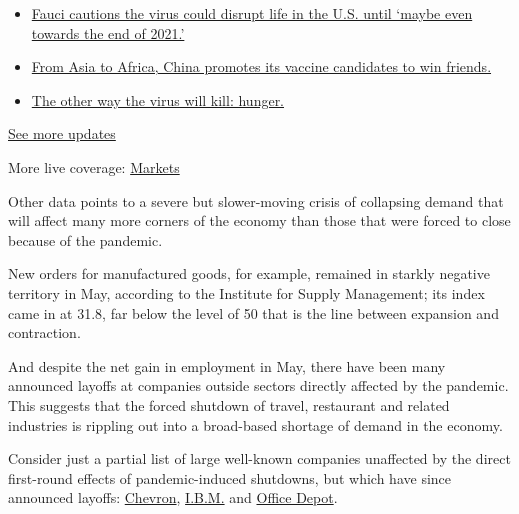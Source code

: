 \begin{itemize}
\tightlist
\item
  \href{https://www.nytimes3xbfgragh.onion/2020/09/11/world/covid-19-coronavirus.html?action=click\&pgtype=Article\&state=default\&region=MAIN_CONTENT_1\&context=storylines_live_updates\#link-dfb8a16}{Fauci
  cautions the virus could disrupt life in the U.S. until `maybe even
  towards the end of 2021.'}
\item
  \href{https://www.nytimes3xbfgragh.onion/2020/09/11/world/covid-19-coronavirus.html?action=click\&pgtype=Article\&state=default\&region=MAIN_CONTENT_1\&context=storylines_live_updates\#link-7104d154}{From
  Asia to Africa, China promotes its vaccine candidates to win friends.}
\item
  \href{https://www.nytimes3xbfgragh.onion/2020/09/11/world/covid-19-coronavirus.html?action=click\&pgtype=Article\&state=default\&region=MAIN_CONTENT_1\&context=storylines_live_updates\#link-393ad215}{The
  other way the virus will kill: hunger.}
\end{itemize}

\href{https://www.nytimes3xbfgragh.onion/2020/09/11/world/covid-19-coronavirus.html?action=click\&pgtype=Article\&state=default\&region=MAIN_CONTENT_1\&context=storylines_live_updates}{See
more updates}

More live coverage:
\href{https://www.nytimes3xbfgragh.onion/live/2020/09/11/business/stock-market-today-coronavirus?action=click\&pgtype=Article\&state=default\&region=MAIN_CONTENT_1\&context=storylines_live_updates}{Markets}

Other data points to a severe but slower-moving crisis of collapsing
demand that will affect many more corners of the economy than those that
were forced to close because of the pandemic.

New orders for manufactured goods, for example, remained in starkly
negative territory in May, according to the Institute for Supply
Management; its index came in at 31.8, far below the level of 50 that is
the line between expansion and contraction.

And despite the net gain in employment in May, there have been many
announced layoffs at companies outside sectors directly affected by the
pandemic. This suggests that the forced shutdown of travel, restaurant
and related industries is rippling out into a broad-based shortage of
demand in the economy.

Consider just a partial list of large well-known companies unaffected by
the direct first-round effects of pandemic-induced shutdowns, but which
have since announced layoffs:
\href{https://www.reuters.com/article/us-chevron-layoffs-exclusive/exclusive-chevron-to-cut-up-to-15-of-staff-amid-restructuring-idUSKBN2332P3}{Chevron},
\href{https://www.wsj.com/articles/ibm-announces-first-job-cuts-under-new-chief-executive-11590113061}{I.B.M.}
and
\href{https://www.cnbc.com/2020/05/15/office-depot-plans-store-closures-13100-job-cuts-by-2023.html}{Office
Depot}.

